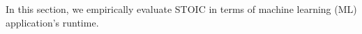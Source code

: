 In this section, we empirically evaluate STOIC in terms of machine learning (ML) application's runtime.